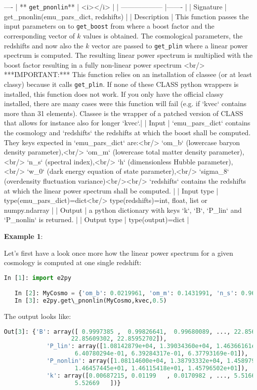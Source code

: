 \documentclass[american,11pt]{article}
\def\code#1{\texttt{#1}}
\begin{document}
----
| ** \code{get\_pnonlin}** | <i></i> |
| ------------------ |-------  |
| Signature | get\_pnonlin(emu\_pars\_dict, redshifts) |
| Description | This function passes the input parameters on to  \code{get\_boost} from where a boost factor and the corresponding vector of $k$ values is obtained. The cosmological parameters, the redshifts and now also the $k$ vector are passed to  \code{get\_plin} where a linear power spectrum is computed. The resulting linear power spectrum is multiplied with the boost factor resulting in a fully non-linear power spectrum <br/> ***IMPORTANT:*** This function relies on an installation of classee (or at least classy) because it calls  \code{get\_plin}. If none of these CLASS python wrappers is installed, this function does not work. If you only have the official classy installed, there are many cases were this function will fail (e.g. if `kvec` contains more than 31 elements). Classee is the wrapper of a patched version of CLASS that allows for instance also for longer `kvec`.|
| Input | `emu\_pars\_dict` contains the cosmology and `redshifts` the redshifts at which the boost shall be computed. They keys expected in `emu\_pars\_dict` are:<br/> `om\_b` (lowercase baryon density parameter),<br/> `om\_m` (lowercase total matter density parameter),<br/> `n\_s` (spectral index),<br/> `h` (dimensionless Hubble parameter),<br/> `w\_0` (dark energy equation of state parameter),<br/> `sigma\_8` (overdensity fluctuation variance)<br/><br/> `redshifts` contains the redshifts at which the linear power spectrum shall be computed. |
| Input type | type(emu\_pars\_dict)=dict<br/> type(redshifts)=int, float, list or numpy.ndarray |
| Output | a python dictionary with keys `k`, `B`, `P\_lin` and `P\_nonlin` is returned. |
| Output type | type(output)=dict |

\textbf{Example 1}:

Let's first have a look once more how the linear power spectrum for a given cosmology is computed at one single redshift:
\begin{lstlisting}[language=python]
   In [1]: import e2py

   In [2]: MyCosmo = {'om_b': 0.0219961, 'om_m': 0.1431991, 'n_s': 0.96, 'h': 0.67, 'w_0': -1.0, 'sigma_8': 0.83}
   In [3]: e2py.get\_pnonlin(MyCosmo,kvec,0.5)
\end{lstlisting}
The output looks like:
\begin{lstlisting}[language=python]
   Out[3]: {'B': array([ 0.9997385 ,  0.99826641,  0.99680089, ..., 22.8561094 ,
                   22.85609302, 22.85952702]),
            'P_lin': array([1.08142879e+04, 1.39034360e+04, 1.46366161e+04, ...,
                    6.40780294e-01, 6.39284317e-01, 6.37793169e-01]),
            'P_nonlin': array([1.08114600e+04, 1.38793332e+04, 1.45897920e+04, ...,
                    1.46457445e+01, 1.46115418e+01, 1.45796502e+01]),
            'k': array([0.00687215, 0.01199   , 0.0170982 , ..., 5.51663   , 5.52166   ,
                    5.52669   ])}
\end{lstlisting}
\end{document}
